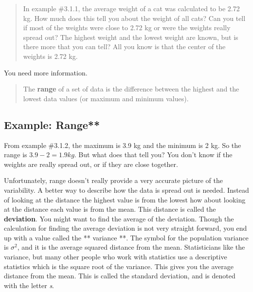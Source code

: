\documentclass[]{book}
\begin{document}
\begin{quote}
In example \#3.1.1, the average weight of a cat was calculated to be 2.72 kg. How much does this tell you about the weight of all cats? Can you tell if most of the weights were close to 2.72 kg or were the weights really spread out? The highest weight and the lowest weight are known, but is there more that you can tell? All you know is that the center of the weights is 2.72 kg.
\end{quote}

You need more information.

\begin{quote}
The \textbf{range} of a set of data is the difference between the highest and the lowest data values (or maximum and minimum values).
\end{quote}

\hypertarget{example-range}{%
\subsection{Example: Range**}\label{example-range}}

From example \#3.1.2, the maximum is 3.9 kg and the minimum is 2 kg. So the range is \(3.9-2=1.9 kg\). But what does that tell you? You don't know if the weights are really spread out, or if they are close together.

Unfortunately, range doesn't really provide a very accurate picture of the variability. A better way to describe how the data is spread out is needed. Instead of looking at the distance the highest value is from the lowest how about looking at the distance each value is from the mean. This distance is called the \textbf{deviation}. You might want to find the average of the deviation. Though the calculation for finding the average deviation is not very straight forward, you end up with a value called the ** variance **. The symbol for the population variance is \(\sigma^2\), and it is the average squared distance from the mean. Statisticians like the variance, but many other people who work with statistics use a descriptive statistics which is the square root of the variance. This gives you the average distance from the mean. This is called the standard deviation, and is denoted with the letter \emph{s}.
\end{document}
